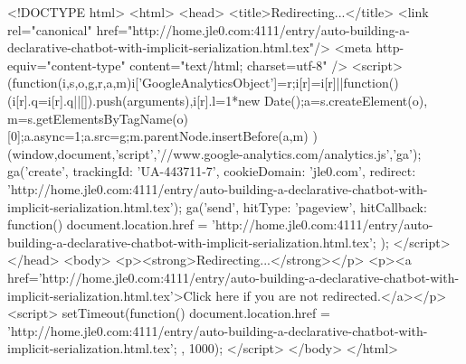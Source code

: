<!DOCTYPE html>
<html>
<head>
<title>Redirecting...</title>
<link rel="canonical" href="http://home.jle0.com:4111/entry/auto-building-a-declarative-chatbot-with-implicit-serialization.html.tex"/>
<meta http-equiv="content-type" content="text/html; charset=utf-8" />
<script>
(function(i,s,o,g,r,a,m){i['GoogleAnalyticsObject']=r;i[r]=i[r]||function(){
(i[r].q=i[r].q||[]).push(arguments)},i[r].l=1*new Date();a=s.createElement(o),
m=s.getElementsByTagName(o)[0];a.async=1;a.src=g;m.parentNode.insertBefore(a,m)
})(window,document,'script','//www.google-analytics.com/analytics.js','ga');
ga('create', { trackingId: 'UA-443711-7', cookieDomain: 'jle0.com', redirect: 'http://home.jle0.com:4111/entry/auto-building-a-declarative-chatbot-with-implicit-serialization.html.tex'});
ga('send', { hitType: 'pageview', hitCallback: function() { document.location.href = 'http://home.jle0.com:4111/entry/auto-building-a-declarative-chatbot-with-implicit-serialization.html.tex'; } });
</script>
</head>
<body>
  <p><strong>Redirecting...</strong></p>
  <p><a href='http://home.jle0.com:4111/entry/auto-building-a-declarative-chatbot-with-implicit-serialization.html.tex'>Click here if you are not redirected.</a></p>
  <script>
    setTimeout(function() { document.location.href = 'http://home.jle0.com:4111/entry/auto-building-a-declarative-chatbot-with-implicit-serialization.html.tex'; }, 1000);
  </script>
</body>
</html>
